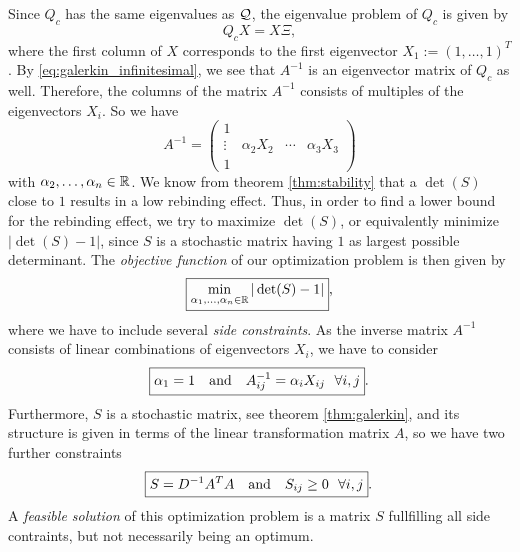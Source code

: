 Since $Q_c$ has the same eigenvalues as $\mathcal{Q}$, the eigenvalue problem of $Q_c$ is given by
\begin{equation*}
Q_c X = X \Xi,
\end{equation*}
where the first column of $X$ corresponds to the first eigenvector $X_1 := (1,\dots, 1)^T$.
By \eqref{eq:galerkin_infinitesimal}, we see that $A^{-1}$ is an eigenvector matrix of $Q_c$ as well.
Therefore, the columns of the matrix $A^{-1}$ consists of multiples of the eigenvectors $X_i$. So we have
\begin{equation*}
A^{-1} =
\begin{pmatrix}
1 	  & & & \\
\vdots & \alpha_2 X_2 & \cdots & \alpha_3 X_3 \\
1	  & & &
\end{pmatrix}
\end{equation*}
with $\alpha_2,\dots,\alpha_n \in \mathbb{R}$. We know from theorem \ref{thm:stability} that a $\det(S)$ close to $1$ results in a low rebinding effect. Thus, in order to find a lower bound for the rebinding effect, we try to maximize $\det(S)$, or equivalently minimize $|\det(S)-1|$, since $S$ is a stochastic matrix having $1$ as largest possible determinant.
The \textit{objective function} of our optimization problem is then given by
\begin{equation}
\label{eq:optimization}
\mbox{
\boxed{ \min_{\alpha_1, \dots, \alpha_n \in \mathbb{R}} |\det(S) -1|},
}
\end{equation}
where we have to include several \textit{side constraints}. As the inverse matrix $A^{-1}$ consists of linear combinations of eigenvectors $X_i$, we have to consider
\begin{equation*}
\mbox{
\boxed{ \alpha_1 = 1 \ \ \ \mathrm{and} \ \ \ A_{ij}^{-1} = \alpha_i X_{ij} \ \ \forall i,j}.
}
\end{equation*}
Furthermore, $S$ is a stochastic matrix, see theorem \ref{thm:galerkin}, and its structure is given in terms of the linear transformation matrix $A$, so we have two further constraints
\begin{equation*}
\mbox{
\boxed{S = D^{-1} A^TA \ \ \ \mathrm{and} \ \ \ S_{ij} \geq 0 \ \ \forall i,j}.
}
\end{equation*}
A \textit{feasible solution} of this optimization problem is a matrix $S$ fullfilling all side contraints, but not necessarily being an optimum.

